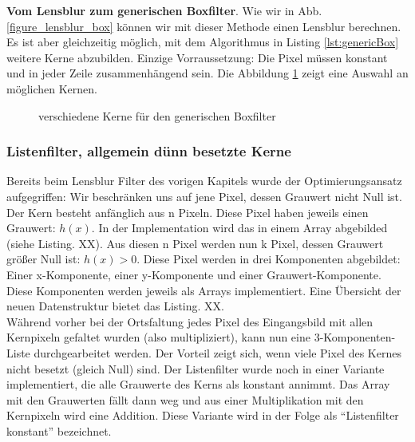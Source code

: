 \documentclass[a4paper,12pt]{article}
\begin{document}
\textbf{Vom Lensblur zum generischen Boxfilter}. Wie wir in Abb.
\ref{figure_lensblur_box} können wir mit dieser Methode einen Lensblur
berechnen. Es ist aber gleichzeitig möglich, mit dem Algorithmus in Listing
\ref{lst:genericBox} weitere Kerne abzubilden. Einzige Vorraussetzung: Die Pixel
müssen konstant und in jeder Zeile zusammenhängend sein. Die Abbildung
\ref{figure_genBox} zeigt eine Auswahl an möglichen Kernen.


\begin{figure}[htbp]
\caption{verschiedene Kerne für den generischen Boxfilter}
\label{figure_genBox}
\end{figure}
 

\subsubsection{Listenfilter, allgemein dünn besetzte
Kerne}\label{chp:listFilter}
Bereits beim Lensblur Filter des vorigen Kapitels wurde der Optimierungsansatz
aufgegriffen: Wir beschränken uns auf jene Pixel, dessen Grauwert nicht Null
ist. Der Kern besteht anfänglich aus n Pixeln. Diese Pixel haben jeweils einen
Grauwert: $h(x)$. In der Implementation wird das in einem Array abgebilded
(siehe Listing. XX). Aus diesen n Pixel werden nun k Pixel, dessen Grauwert
größer Null ist: $h(x) > 0$. Diese Pixel werden in drei Komponenten
abgebildet:
Einer x-Komponente, einer y-Komponente und einer Grauwert-Komponente. Diese
Komponenten werden jeweils als Arrays implementiert. Eine Übersicht der neuen
Datenstruktur bietet das Listing. XX. \\
Während vorher bei der Ortsfaltung jedes Pixel des Eingangsbild mit allen
Kernpixeln gefaltet wurden (also multipliziert), kann nun eine
3-Komponenten-Liste durchgearbeitet werden. Der Vorteil zeigt sich, wenn viele
Pixel des Kernes nicht besetzt (gleich Null) sind.
Der Listenfilter wurde noch in einer Variante implementiert, die alle Grauwerte
des Kerns als konstant annimmt. Das Array mit den Grauwerten fällt dann weg und
aus einer Multiplikation mit den Kernpixeln wird eine Addition. Diese Variante
wird in der Folge als "`Listenfilter konstant"' bezeichnet.
\end{document}
